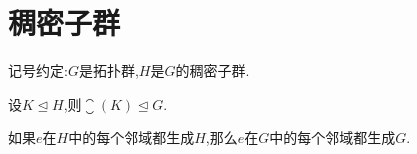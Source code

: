 \section{稠密子群}

记号约定:$G$是拓扑群,$H$是$G$的稠密子群.

\begin{proposition}{}{}
	设$K\unlhd H$,则$\closure\left(K\right)\unlhd G$.
\end{proposition}

\begin{proposition}{}{}
	如果$e$在$H$中的每个邻域都生成$H$,那么$e$在$G$中的每个邻域都生成$G$.
\end{proposition}